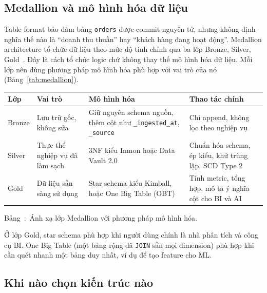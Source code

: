 \documentclass[12pt]{article}
\newenvironment{figblock}{\par\medskip\noindent\begin{minipage}{\linewidth}}{\end{minipage}\par\medskip}
\newcounter{bang}
\newcommand{\tabcap}[2]{%
  \begin{captionbelowboxaivn}\refstepcounter{bang}Bảng~\thebang:~#1\label{#2}\end{captionbelowboxaivn}}
\begin{document}
\subsection{Medallion và mô hình hóa dữ liệu}

Table format bảo đảm bảng \texttt{orders} được commit nguyên tử, nhưng không định nghĩa thế nào là ``doanh thu thuần'' hay ``khách hàng đang hoạt động''. Medallion architecture tổ chức dữ liệu theo mức độ tinh chỉnh qua ba lớp Bronze, Silver, Gold~\cite{databricks2026medallion}. Đây là cách tổ chức logic chứ không thay thế mô hình hóa dữ liệu. Mỗi lớp nên dùng phương pháp mô hình hóa phù hợp với vai trò của nó (Bảng~\ref{tab:medallion}).

\begin{figblock}\begin{center}
\renewcommand{\arraystretch}{1.3}
\begin{tabularx}{\linewidth}{|P{1.6cm}|L|L|L|}
\hline
{}
\textbf{Lớp} & \textbf{Vai trò} & \textbf{Mô hình hóa} & \textbf{Thao tác chính} \\
\hline
Bronze & Lưu trữ gốc, không sửa & Giữ nguyên schema nguồn, thêm cột như \texttt{\_ingested\_at}, \texttt{\_source} & Chỉ append, không lọc theo nghiệp vụ \\
\hline
Silver & Thực thể nghiệp vụ đã làm sạch & 3NF kiểu Inmon hoặc Data Vault 2.0 & Chuẩn hóa schema, ép kiểu, khử trùng lặp, SCD Type 2 \\
\hline
Gold & Dữ liệu sẵn sàng sử dụng & Star schema kiểu Kimball, hoặc One Big Table (OBT) & Tính metric, tổng hợp, mô tả ý nghĩa cột cho BI và AI \\
\hline
\end{tabularx}
\end{center}
\tabcap{Ánh xạ lớp Medallion với phương pháp mô hình hóa.}{tab:medallion}
\end{figblock}

Ở lớp Gold, star schema phù hợp khi người dùng chính là nhà phân tích và công cụ BI. One Big Table (một bảng rộng đã \texttt{JOIN} sẵn mọi dimension) phù hợp khi cần quét nhanh một bảng duy nhất, ví dụ để tạo feature cho ML.

\subsection{Khi nào chọn kiến trúc nào}
\end{document}
